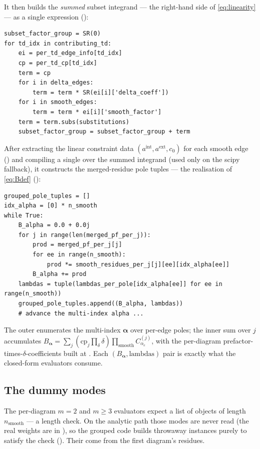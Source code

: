It then builds the \emph{summed} subset integrand --- the right-hand side of
\eqref{eq:linearity} --- as a single  expression
():
\begin{lstlisting}
subset_factor_group = SR(0)
for td_idx in contributing_td:
    ei = per_td_edge_info[td_idx]
    cp = per_td_cp[td_idx]
    term = cp
    for i in delta_edges:
        term = term * SR(ei[i]['delta_coeff'])
    for i in smooth_edges:
        term = term * ei[i]['smooth_factor']
    term = term.subs(substitutions)
    subset_factor_group = subset_factor_group + term
\end{lstlisting}
After extracting the linear constraint data $(a^{\text{int}}, a^{\text{ext}}, c_0)$
for each smooth edge () and compiling a single
 over the summed integrand (used only on the scipy fallback),
it constructs the merged-residue pole tuples --- the realisation of
\eqref{eq:Bdef} ():
\begin{lstlisting}
grouped_pole_tuples = []
idx_alpha = [0] * n_smooth
while True:
    B_alpha = 0.0 + 0.0j
    for j in range(len(merged_pf_per_j)):
        prod = merged_pf_per_j[j]
        for ee in range(n_smooth):
            prod *= smooth_residues_per_j[j][ee][idx_alpha[ee]]
        B_alpha += prod
    lambdas = tuple(lambdas_per_pole[idx_alpha[ee]] for ee in range(n_smooth))
    grouped_pole_tuples.append((B_alpha, lambdas))
    # advance the multi-index alpha ...
\end{lstlisting}
The outer  enumerates the multi-index $\bm\alpha$ over per-edge poles;
the inner sum over $j$ accumulates $B_{\bm\alpha} = \sum_j (\mathrm{cp}_j
\prod_\delta \delta) \prod_{\text{smooth}} C^{(j)}_{\alpha_e}$, with
 the per-diagram prefactor-times-$\delta$-coefficients
built at . Each $(B_{\bm\alpha},
\text{lambdas})$ pair is exactly what the closed-form evaluators consume.

\subsection{The dummy modes}\label{sec:dummymodes}

The per-diagram $m=2$ and $m\ge 3$ evaluators expect a list of 
objects of length $n_{\text{smooth}}$ --- a length check. On the analytic path
those modes are never read (the real weights are in ), so the
grouped code builds throwaway  instances purely to satisfy the
check (). Their  come from the
first diagram's residues.

